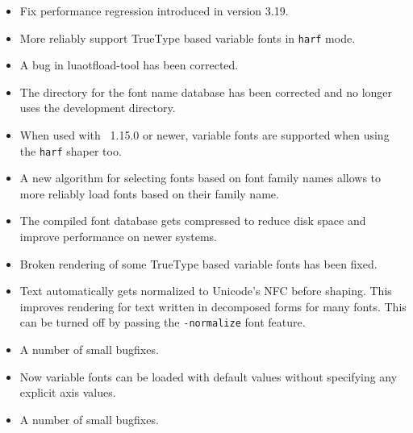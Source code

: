 \begin{itemize}
  \item Fix performance regression introduced in version 3.19.
  \item More reliably support TrueType based variable fonts in \texttt{harf}
    mode.
\end{itemize}
\endsubsection

\begin{itemize}
  \item A bug in luaotfload-tool has been corrected.
  \item The directory for the font name database has been corrected and no
    longer uses the development directory.
\end{itemize}
\endsubsection

\begin{itemize}
  \item When used with \LuaTeX\ 1.15.0 or newer, variable fonts are supported
    when using the \texttt{harf} shaper too.
  \item A new algorithm for selecting fonts based on font family names allows
    to more reliably load fonts based on their family name.
  \item The compiled font database gets compressed to reduce disk space and
    improve performance on newer systems.
  \item Broken rendering of some TrueType based variable fonts has been fixed.
  \item Text automatically gets normalized to Unicode's NFC before shaping.
    This improves rendering for text written in decomposed forms for many
    fonts. This can be turned off by passing the \texttt{-normalize} font
    feature.
  \item A number of small bugfixes.
 \end{itemize}
\endsubsection

\begin{itemize}
  \item Now variable fonts can be loaded with default values without specifying
    any explicit axis values.
  \item A number of small bugfixes.
 \end{itemize}
\endsubsection

